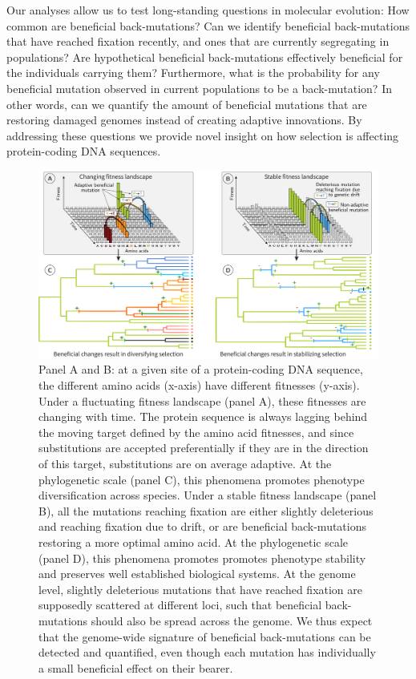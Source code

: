 \documentclass{article}
\begin{document}
    Our analyses allow us to test long-standing questions in molecular evolution:
    How common are beneficial back-mutations?
    Can we identify beneficial back-mutations that have reached fixation recently, and ones that are currently segregating in populations?
    Are hypothetical beneficial back-mutations effectively beneficial for the individuals carrying them?
    Furthermore, what is the probability for any beneficial mutation observed in current populations to be a back-mutation?
    In other words, can we quantify the amount of beneficial mutations that are restoring damaged genomes instead of creating adaptive innovations.
    By addressing these questions we provide
    novel insight on how selection is affecting protein-coding DNA sequences.

    \begin{figure}[!ht]
        \centering
        \includegraphics[width=\textwidth, page=1] {artworks/figure.fitness-landscape}
        \caption{
            Panel A and B: at a given site of a protein-coding DNA sequence, the different amino acids (x-axis) have different fitnesses (y-axis).
            Under a fluctuating fitness landscape (panel A), these fitnesses are changing with time.
            The protein sequence is always lagging behind the moving target defined by the amino acid fitnesses, and since substitutions are accepted preferentially if they are in the direction of this target, substitutions are on average adaptive.
            At the phylogenetic scale (panel C), this phenomena promotes phenotype diversification across species.
            Under a stable fitness landscape (panel B), all the mutations reaching fixation are either slightly deleterious and reaching fixation due to drift, or are beneficial back-mutations restoring a more optimal amino acid.
            At the phylogenetic scale (panel D), this phenomena promotes promotes phenotype stability and preserves well established biological systems.
            At the genome level, slightly deleterious mutations that have reached fixation are supposedly scattered at different loci, such that beneficial back-mutations should also be spread across the genome.
            We thus expect that the genome-wide signature of beneficial back-mutations can be detected and quantified, even though each mutation has individually a small beneficial effect on their bearer.
        }
        \label{fig:fitness-landscape}
    \end{figure}
\end{document}
